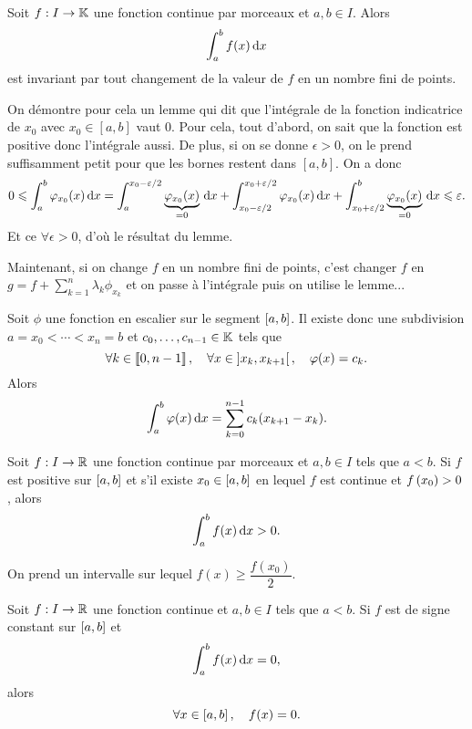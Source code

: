 \documentclass{magnolia}
\begin{document}
\begin{proposition}[utile=-3]
Soit $f:I\to\mathbb{K}$ une fonction continue par morceaux et $a,b\in I$. Alors
\[\int_{a}^{b} f(x)\,\text{d}x\]
est invariant par tout changement de la valeur de $f$ en un nombre fini de points.
\end{proposition}

\begin{preuve}
On démontre pour cela un lemme qui dit que l'intégrale de la fonction indicatrice de $x_0$ avec $x_0\in [a,b]$ vaut $0$. Pour cela, tout d'abord, on sait que la fonction est positive donc l'intégrale aussi. De plus, si on se donne $\epsilon>0$, on le prend suffisamment petit pour que les bornes restent dans $[a,b]$. On a donc $$0\leqslant \int_{a}^{b} \varphi_{x_0}(x)\,\text{d}x=\int_{a}^{x_0-\varepsilon/2} \underbrace{\varphi_{x_0}(x)}_{=0}\,\text{d}x+\int_{x_0-\varepsilon/2}^{x_0+\varepsilon/2} \varphi_{x_0}(x)\,\text{d}x+\int_{x_0+\varepsilon/2}^{b} \underbrace{\varphi_{x_0}(x)}_{=0}\,\text{d}x\leqslant \varepsilon.$$ Et ce $\forall \epsilon>0$, d'où le résultat du lemme.

Maintenant, si on change $f$ en un nombre fini de points, c'est changer $f$ en $g=f+\sum_{k=1}^n\lambda_k\phi_{x_k}$ et on passe à l'intégrale puis on utilise le lemme...
\end{preuve}

\begin{remarqueUnique}
\remarque[utile=-3] Soit $\phi$ une fonction en escalier sur le segment $\left[a,b\right]$. Il existe donc une subdivision $a=x_0<\cdots<x_n=b$ et $c_0,\ldots,c_{n-1}\in\mathbb{K}$ tels que
\[\forall k\in\left\llbracket 0,n-1\right\rrbracket,\quad \forall x\in\left]x_k,x_{k+1}\right[ ,\quad \varphi(x)=c_k.\]
Alors
\[\int_{a}^{b} \varphi(x)\,\text{d}x=\sum_{k=0}^{n-1} c_k(x_{k+1}-x_k).\]
\end{remarqueUnique}


\begin{proposition}[utile=2]
Soit $f:I\to\mathbb{R}$ une fonction continue par morceaux et $a, b\in I$ tels que $a< b$. Si $f$ est positive sur $\left[a,b\right]$ et s'il existe
$x_0\in\left[a,b\right]$ en lequel $f$ est continue et $f\left(x_0\right)>0$, alors
\[\int_{a}^{b} f(x)\,\text{d}x>0.\]
\end{proposition}

\begin{preuve}
On prend un intervalle sur lequel $f(x)\geq \dfrac{f(x_0)}{2}$.
\end{preuve}


\begin{proposition}[utile=2]
Soit $f:I\to\mathbb{R}$ une fonction continue et $a,b\in I$ tels que $a< b$. Si $f$ est de
signe constant sur $\left[a,b\right]$ et
\[\int_{a}^{b} f(x)\,\text{d}x=0,\]
alors
\[\forall x\in\left[a,b\right] ,\quad f(x)=0.\]
\end{proposition}
\end{document}
